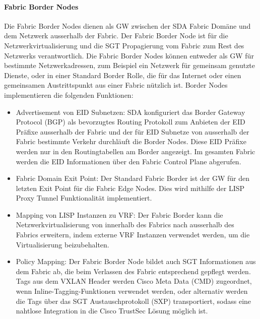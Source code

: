 \paragraph{Fabric Border Nodes}
Die Fabric Border Nodes dienen als GW zwischen der SDA Fabric Domäne und dem Netzwerk ausserhalb der Fabric. Der Fabric Border Node ist für die Netzwerkvirtualisierung und die SGT Propagierung vom Fabric zum Rest des Netzwerks verantwortlich. Die Fabric Border Nodes können entweder als GW für bestimmte Netzwerkadressen, zum Beispiel ein Netzwerk für gemeinsam genutzte Dienste, oder in einer Standard Border Rolle, die für das Internet oder einen gemeinsamen Austrittspunkt aus einer Fabric nützlich ist. Border Nodes implementieren die folgenden Funktionen: \cite{sda-designguide}
\begin{itemize}	
	\item Advertisement von EID Subnetzen: SDA konfiguriert das Border Gateway Protocol (BGP) als bevorzugtes Routing Protokoll zum Anbieten der EID Präfixe ausserhalb der Fabric und der für EID Subnetze von ausserhalb der Fabric bestimmte Verkehr durchläuft die Border Nodes. Diese EID Präfixe werden nur in den Routingtabellen am Border angezeigt. Im gesamten Fabric werden die EID Informationen über den Fabric Control Plane abgerufen.
	\item Fabric Domain Exit Point: Der Standard Fabric Border ist der GW für den letzten Exit Point für die Fabric Edge Nodes. Dies wird mithilfe der LISP Proxy Tunnel Funktionalität implementiert.
	\item Mapping von LISP Instanzen zu VRF: Der Fabric Border kann die Netzwerkvirtualisierung von innerhalb des Fabrics nach ausserhalb des Fabrics erweitern, indem externe VRF Instanzen verwendet werden, um die Virtualisierung beizubehalten.
	\item Policy Mapping: Der Fabric Border Node bildet auch SGT Informationen aus dem Fabric ab, die beim Verlassen des Fabric entsprechend gepflegt werden. Tags aus dem VXLAN Header werden Cisco Meta Data (CMD) zugeordnet, wenn Inline-Tagging-Funktionen verwendet werden, oder alternativ werden die Tags über das SGT Austauschprotokoll (SXP) transportiert, sodass eine nahtlose Integration in die Cisco TrustSec Lösung möglich ist.
\end{itemize}


